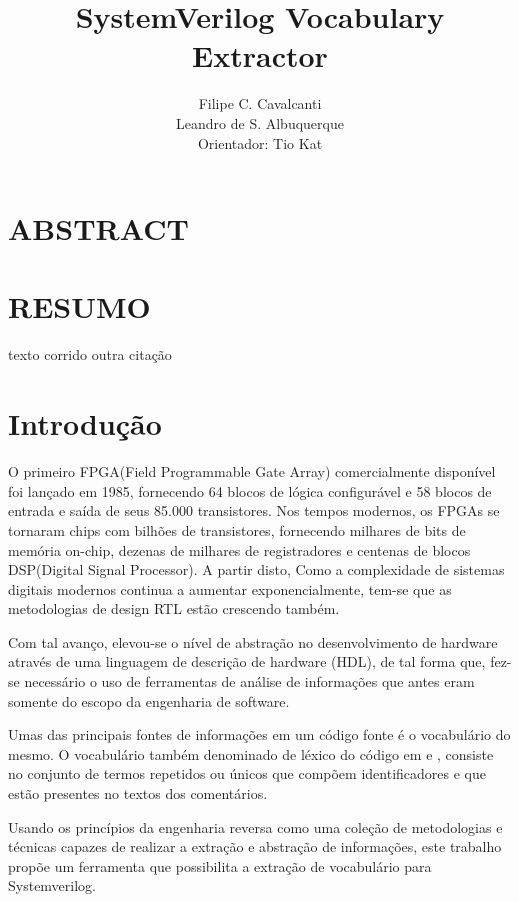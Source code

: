 \documentclass[12pt, twocolumn, a4paper]{article}
\begin{document}
	\title{SystemVerilog Vocabulary Extractor}
	\author{Filipe C. Cavalcanti\\ Leandro de S. Albuquerque\\
	Orientador: Tio Kat}
	\maketitle
	
	\section{ABSTRACT}
	
	\section{RESUMO}
	texto corrido\cite{Antoniol2007}
	outra citação\cite{Alfke1943}
	\section{Introdução}
\quad O primeiro FPGA(Field Programmable Gate Array) comercialmente disponível  foi lançado em 1985, fornecendo 64 blocos de lógica configurável e 58 blocos de entrada e saída de seus 85.000 transistores\cite{Alfke1943}. Nos tempos modernos, os FPGAs se tornaram chips com bilhões de transistores, fornecendo milhares de bits de memória on-chip, dezenas de milhares de registradores e centenas de blocos DSP(Digital Signal Processor)\cite{Marc-Andre}. A partir disto, Como a complexidade de sistemas digitais modernos continua a aumentar exponencialmente, tem-se que as metodologias de design RTL estão crescendo também\cite{Marc-Andre}.

Com tal avanço, elevou-se o nível de abstração no desenvolvimento de hardware através de uma linguagem de descrição de hardware (HDL), de tal forma que, fez-se necessário o uso de ferramentas de análise de informações que antes eram somente do escopo da engenharia de software.

Umas das principais fontes de informações em um código fonte é o vocabulário do mesmo. O vocabulário também denominado de léxico do código em \cite{Host2007} e \cite{Antoniol2007}, consiste no conjunto de termos repetidos ou únicos que compõem identificadores e que estão presentes no textos dos comentários\cite{Abebe2009}.

Usando os princípios da engenharia reversa como uma coleção de metodologias e técnicas capazes de realizar a extração e abstração de informações\cite{BENEDUSI1992225}, este trabalho propõe um ferramenta que possibilita a extração de vocabulário para Systemverilog.
\end{document}
